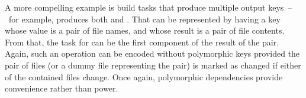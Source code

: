 A more compelling example is build tasks that produce multiple output
keys~--~for example,  produces both  and .
That can be represented by having a key whose value is a pair of file names, and
whose result is a pair of file contents. From that, the task for 
can be the first component of the result of the pair. Again, such an operation
can be encoded without polymorphic keys provided the pair of files (or a dummy
file representing the pair) is marked as changed if either of the contained
files change. Once again, polymorphic dependencies provide convenience rather
than power.


